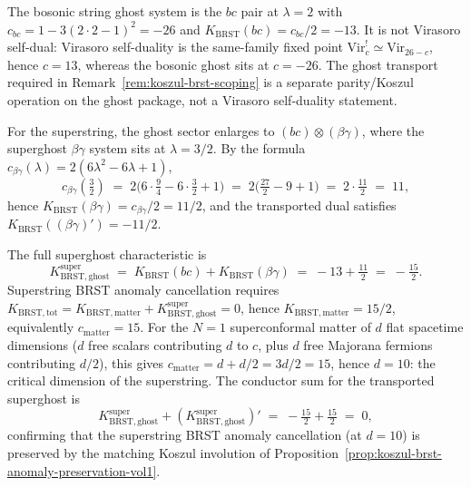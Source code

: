 \begin{computation}
\label{comp:v1-superstring-ghost-koszul}
The bosonic string ghost system is the $bc$ pair at $\lambda = 2$
with $c_{bc} = 1 - 3(2{\cdot}2 - 1)^2 = -26$ and
$K_{\mathrm{BRST}}(bc)=c_{bc}/2=-13$. It is not Virasoro self-dual:
Virasoro self-duality is the same-family fixed point
$\mathrm{Vir}_c^!\simeq\mathrm{Vir}_{26-c}$, hence $c = 13$, whereas
the bosonic ghost sits at $c=-26$. The ghost transport required in
Remark~\ref{rem:koszul-brst-scoping} is a separate parity/Koszul
operation on the ghost package, not a Virasoro self-duality statement.

For the superstring, the ghost sector enlarges to
$(bc) \otimes (\beta\gamma)$, where the superghost
$\beta\gamma$ system sits at $\lambda = 3/2$. By the
formula $c_{\beta\gamma}(\lambda) = 2(6\lambda^2 - 6\lambda + 1)$,
\[
 c_{\beta\gamma}(\tfrac{3}{2})
 \;=\; 2\bigl(6 \cdot \tfrac{9}{4}
 - 6 \cdot \tfrac{3}{2} + 1\bigr)
 \;=\; 2\bigl(\tfrac{27}{2} - 9 + 1\bigr)
 \;=\; 2 \cdot \tfrac{11}{2}
 \;=\; 11,
\]
hence $K_{\mathrm{BRST}}(\beta\gamma)=c_{\beta\gamma}/2=11/2$, and
the transported dual satisfies
$K_{\mathrm{BRST}}((\beta\gamma)')=-11/2$.

The full superghost characteristic is
\[
 K_{\mathrm{BRST,ghost}}^{\mathrm{super}}
 \;=\; K_{\mathrm{BRST}}(bc) + K_{\mathrm{BRST}}(\beta\gamma)
 \;=\; -13 + \tfrac{11}{2}
 \;=\; -\tfrac{15}{2}.
\]
Superstring BRST anomaly cancellation requires
$K_{\mathrm{BRST,tot}} = K_{\mathrm{BRST,matter}}
+ K_{\mathrm{BRST,ghost}}^{\mathrm{super}} = 0$,
hence $K_{\mathrm{BRST,matter}} = 15/2$, equivalently
$c_{\mathrm{matter}} = 15$. For the $N = 1$ superconformal
matter of $d$ flat spacetime dimensions
($d$ free scalars contributing $d$ to $c$, plus $d$ free
Majorana fermions contributing $d/2$), this gives
$c_{\mathrm{matter}} = d + d/2 = 3d/2 = 15$, hence
$d = 10$: the critical dimension of the superstring. The
conductor sum for the transported superghost is
\[
 K_{\mathrm{BRST,ghost}}^{\mathrm{super}}
 + (K_{\mathrm{BRST,ghost}}^{\mathrm{super}})'
 \;=\; -\tfrac{15}{2} + \tfrac{15}{2}
 \;=\; 0,
\]
confirming that the superstring BRST anomaly cancellation
\textup{(}at $d = 10$\textup{)} is preserved by the matching
Koszul involution of Proposition~\ref{prop:koszul-brst-anomaly-preservation-vol1}.
\end{computation}

